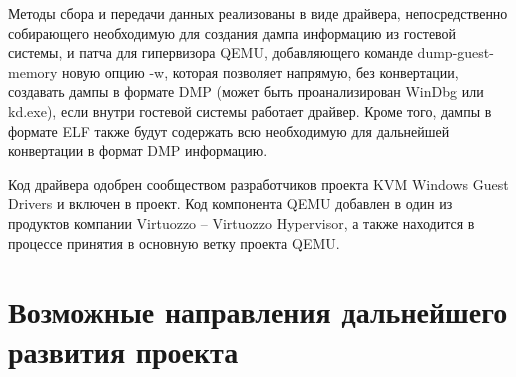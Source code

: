\documentclass{mipt-thesis-bs}
\begin{document}
Методы сбора и передачи данных реализованы в виде драйвера, непосредственно собирающего необходимую для создания дампа информацию из гостевой системы, и патча для гипервизора QEMU, добавляющего команде dump-guest-memory новую опцию -w, которая позволяет напрямую, без конвертации, создавать дампы в формате DMP (может быть проанализирован WinDbg или kd.exe), если внутри гостевой системы работает драйвер. Кроме того, дампы в формате ELF также будут содержать всю необходимую для дальнейшей конвертации в формат DMP информацию.

Код драйвера одобрен сообществом разработчиков проекта KVM Windows Guest Drivers и включен в проект. Код компонента QEMU добавлен в один из продуктов компании Virtuozzo -- Virtuozzo Hypervisor, а также находится в процессе принятия в основную ветку проекта QEMU.

\chapter{Возможные направления дальнейшего развития проекта}
\end{document}
